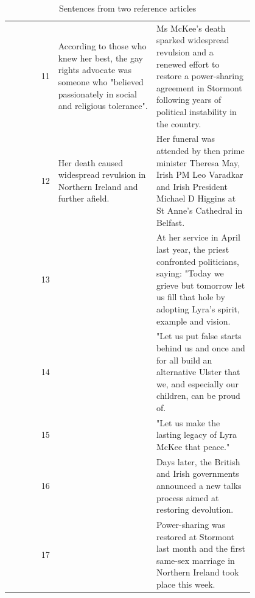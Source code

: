 \begin{table}[!htbp]
\begin{tabular}{r | p{0.4\linewidth} | p{0.4\linewidth} }
        11\vspace{-2px} & \tiny{According to those who knew her best, the gay rights advocate was someone who "believed passionately in social and religious tolerance".}\vspace{-2px} & \tiny{Ms McKee's death sparked widespread revulsion and a renewed effort to restore a power-sharing agreement in Stormont following years of political instability in the country.}\vspace{-2px} \\
        12\vspace{-2px} & \tiny{Her death caused widespread revulsion in Northern Ireland and further afield.}\vspace{-2px} & \tiny{Her funeral was attended by then prime minister Theresa May, Irish PM Leo Varadkar and Irish President Michael D Higgins at St Anne's Cathedral in Belfast.}\vspace{-2px} \\
        13\vspace{-2px} &  & \tiny{At her service in April last year, the priest confronted politicians, saying: "Today we grieve but tomorrow let us fill that hole by adopting Lyra's spirit, example and vision.}\vspace{-2px} \\
        14\vspace{-2px} &  & \tiny{"Let us put false starts behind us and once and for all build an alternative Ulster that we, and especially our children, can be proud of.}\vspace{-2px} \\
        15\vspace{-2px} &  & \tiny{"Let us make the lasting legacy of Lyra McKee that peace."}\vspace{-2px} \\
        16\vspace{-2px} &  & \tiny{Days later, the British and Irish governments announced a new talks process aimed at restoring devolution.}\vspace{-2px} \\
        17\vspace{-2px} &  & \tiny{Power-sharing was restored at Stormont last month and the first same-sex marriage in Northern Ireland took place this week.} \vspace{-2px}
       \end{tabular}
       \caption{Sentences from two reference articles}
       \label{tab:sentences}
\end{table}



